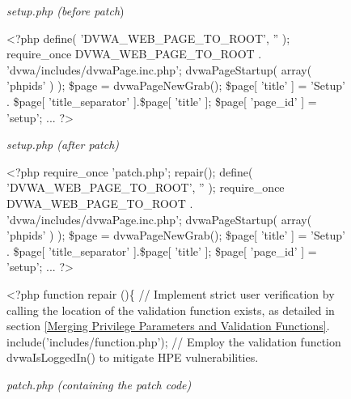 \documentclass[10pt,journal,compsoc]{IEEEtran}
\begin{document}
\begin{CJK}{UTF8}{gbsn}
\begin{figure*}[ht]
\begin{minipage}[t]{0.48\textwidth}
\begin{algorithm}[H]
\small
\renewcommand{\thealgorithm}{}
\caption{\textit{setup.php (before patch})}
\begin{algorithmic}[1]
\State \textless?php
\State define( 'DVWA\_WEB\_PAGE\_TO\_ROOT', '' );
\State require\_once DVWA\_WEB\_PAGE\_TO\_ROOT . 'dvwa/includes/dvwaPage.inc.php';
\State dvwaPageStartup( array( 'phpids' ) );
\State \$page = dvwaPageNewGrab();
\State \$page[ 'title' ]   = 'Setup' . \$page[ 'title\_separator' ].\$page[ 'title' ];
\State \$page[ 'page\_id' ] = 'setup';
\State ...
\State ?\textgreater 
\end{algorithmic}
\end{algorithm}
\end{minipage}
\hfill
\begin{minipage}[t]{0.48\textwidth}
\begin{algorithm}[H]
\small
\renewcommand{\thealgorithm}{}
\caption{\textit{setup.php (after patch)}}
\begin{algorithmic}[1]
\State \textless?php
\State \textcolor[rgb]{0.16,0.32,0.66}{require\_once 'patch.php';}
\State \textcolor[rgb]{0.16,0.32,0.66}{repair();}
\State define( 'DVWA\_WEB\_PAGE\_TO\_ROOT', '' );
\State require\_once DVWA\_WEB\_PAGE\_TO\_ROOT . 'dvwa/includes/dvwaPage.inc.php';
\State dvwaPageStartup( array( 'phpids' ) );
\State \$page = dvwaPageNewGrab();
\State \$page[ 'title' ]   = 'Setup' . \$page[ 'title\_separator' ].\$page[ 'title' ];
\State \$page[ 'page\_id' ] = 'setup';
\State ...
\State ?\textgreater 
\end{algorithmic}
\end{algorithm}
\end{minipage}
\hfill
\begin{minipage}[t]{1\textwidth}
\begin{algorithm}[H]
\small
\renewcommand{\thealgorithm}{}
\caption{\textit{patch.php (containing the patch code)}}
\begin{algorithmic}[1]
\State \textless?php
\State function repair ()\{
\Statex \textcolor[rgb]{0.16,0.32,0.66}{// Implement strict user verification by calling the location of the validation function exists, as detailed in section \ref{Merging Privilege Parameters and Validation Functions}.}
\State include('includes/function.php');
\Statex \textcolor[rgb]{0.16,0.32,0.66}{// Employ the validation function dvwaIsLoggedIn() to mitigate HPE vulnerabilities.}

\end{algorithmic}
\end{algorithm}
\end{minipage}
\end{figure*}
\end{CJK}
\end{document}
